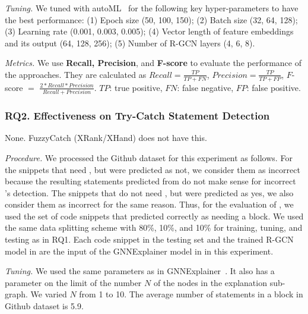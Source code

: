 {\em Tuning.} We tuned {\tool} with autoML~\cite{NNI} for the
following key hyper-parameters to have the best performance: (1) Epoch
size (50, 100, 150); (2) Batch size (32, 64, 128); (3) Learning rate
(0.001, 0.003, 0.005); (4) Vector length of feature embeddings and its
output (64, 128, 256); (5) Number of R-GCN layers (4, 6, 8).

{\em Metrics.} We use \textbf{Recall, Precision}, and {\bf F-score} to
evaluate the performance of the approaches. They are calculated as
$Recall = \frac{TP}{TP+FN}$, $Precision = \frac{TP}{TP+FP}$, $F$-score
$=$ $\frac{2*Recall*Precision}{Recall+Precision}$. $TP$: true
positive, $FN$: false negative, $FP$: false positive.

\subsubsection{RQ2. Effectiveness on Try-Catch Statement Detection\\}

 None. FuzzyCatch (XRank/XHand) does not have
this.

{\em Procedure.} We processed the Github dataset for this experiment
as follows. For the snippets that need , but were
predicted as not, we consider them as incorrect because the resulting
statements predicted from {\xstate} do not make sense for incorrect
{\xblock}'s detection. The snippets that do not need ,
but were predicted as yes, we also consider them as incorrect for the
same reason. Thus, for the evaluation of {\xstate}, we used the set of
code snippets that {\xblock} predicted correctly as needing a
 block. We used the same data splitting scheme with
80\%, 10\%, and 10\% for training, tuning, and testing as in RQ1. Each code
snippet in the testing set and the trained R-GCN model in {\xblock}
are the input of the GNNExplainer model in {\xstate} in this
experiment.


{\em Tuning.} We used the same parameters as in
GNNExplainer~\cite{GNNExplainer}. It also has a parameter on the limit
of the number $N$ of the nodes in the explanation sub-graph. We
varied $N$ from 1 to 10. The average number of statements in a
 block in Github dataset is 5.9.

